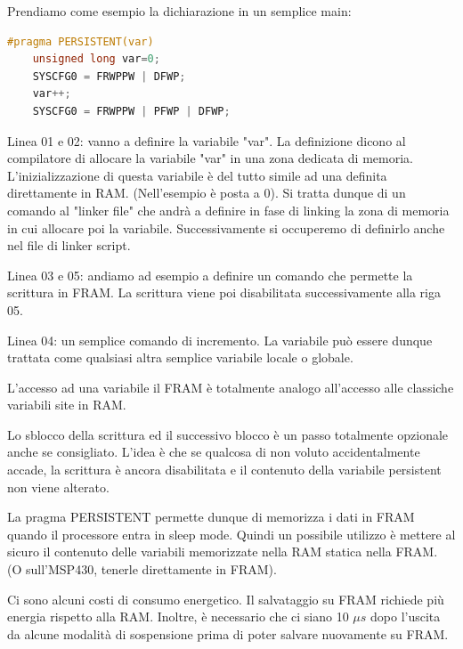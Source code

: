 \documentclass[LaM,binding=0.6cm,oneside]{../sapthesis}
\begin{document}
Prendiamo come esempio la dichiarazione in un semplice main:
\begin{lstlisting}[language=C]
    #pragma PERSISTENT(var)  
    unsigned long var=0;  
    SYSCFG0 = FRWPPW | DFWP;           
    var++;   
    SYSCFG0 = FRWPPW | PFWP | DFWP; 

\end{lstlisting}
\vspace{2cm}
\begin{small}
Linea 01 e 02: vanno a definire la variabile "var". La definizione  dicono al compilatore di allocare la variabile "var" in una zona dedicata di memoria. L'inizializzazione di questa variabile è del tutto simile ad una definita direttamente in RAM. (Nell'esempio è posta a 0).
Si tratta dunque di un comando al "linker file" che andrà a definire in fase di linking la zona di memoria in cui allocare poi la variabile. Successivamente si occuperemo di definirlo anche nel file di linker script.\newline

Linea 03 e 05: andiamo ad esempio a definire un comando che permette la scrittura in FRAM. La scrittura viene poi disabilitata successivamente alla riga 05.\newline

Linea 04: un semplice comando di incremento. La variabile può essere dunque trattata come qualsiasi altra semplice variabile locale o globale.\newline

\end{small}


\clearpage
L'accesso ad una variabile il FRAM è totalmente analogo all'accesso alle classiche variabili site in RAM.

Lo sblocco della scrittura ed il successivo blocco è un passo totalmente opzionale anche se consigliato. L'idea è che se qualcosa di non voluto accidentalmente accade, la scrittura è ancora disabilitata e il contenuto della variabile persistent non viene alterato.

La pragma PERSISTENT permette dunque di memorizza i dati in FRAM quando il processore entra in sleep mode.
Quindi un possibile utilizzo è mettere al sicuro il contenuto delle variabili memorizzate nella RAM statica nella FRAM. (O sull'MSP430, tenerle direttamente in FRAM).

Ci sono alcuni costi di consumo energetico. Il salvataggio su FRAM richiede più energia rispetto alla RAM. Inoltre, è necessario che ci siano 10 $\mu s$ dopo l'uscita da alcune modalità di sospensione prima di poter salvare nuovamente su FRAM.
\end{document}
